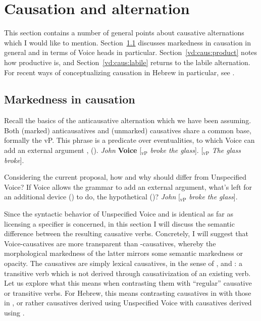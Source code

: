 \section{Causation and alternation} \label{vd:caus}
This section contains a number of general points about causative alternations which I would like to mention. Section~\ref{vd:caus:marked} discusses markedness in causation in general and in terms of Voice heads in particular. Section~\ref{vd:caus:product} notes how productive {\vd} is, and Section~\ref{vd:caus:labile} returns to the labile alternation. For recent ways of conceptualizing causation in Hebrew in particular, see \cite{barashersiegalboneh18wccfl}.

	\subsection{Markedness in causation} \label{vd:caus:marked}
Recall the basics of the anticausative alternation which we have been assuming. Both (marked) anticausatives and (unmarked) causatives share a common base, formally the vP. This phrase is a predicate over eventualities, to which Voice can add an external argument \citep{schaefer08,layering15}, (\nextx).
\pex 
	\a \emph{John} \textbf{Voice} [$_{\text{vP}}$ \emph{broke the glass}].
	\a {\zero} \textbf{\vz} [$_{\text{vP}}$ \emph{The glass broke}].
\xe

Considering the current proposal, how and why should {\vd} differ from Unspecified Voice? If Voice allows the grammar to add an external argument, what's left for an additional device (\vd) to do, the hypothetical (\nextx)?
\ex \emph{John} \textbf{\vd} [$_{\text{vP}}$ \emph{broke the glass}].
\xe

Since the syntactic behavior of Unspecified Voice and {\vd} is identical as far as licensing a specifier is concerned, in this section I will discuss the semantic difference between the resulting causative verbs. Concretely, I will suggest that Voice-causatives are more transparent than {\vd}-causatives, whereby the morphological markedness of the latter mirrors some semantic markedness or opacity. The {\vd} causatives are simply lexical causatives, in the sense of \cite{fodor70}, \cite{miyagawa98} and \cite{harley08}: a transitive verb which is not derived through causativization of an existing verb. Let us explore what this means when contrasting them with ``regular'' causative or transitive verbs. For Hebrew, this means contrasting causatives in {\tkal} with those in {\thif}, or rather causatives derived using Unspecified Voice with causatives derived using {\vd}.

